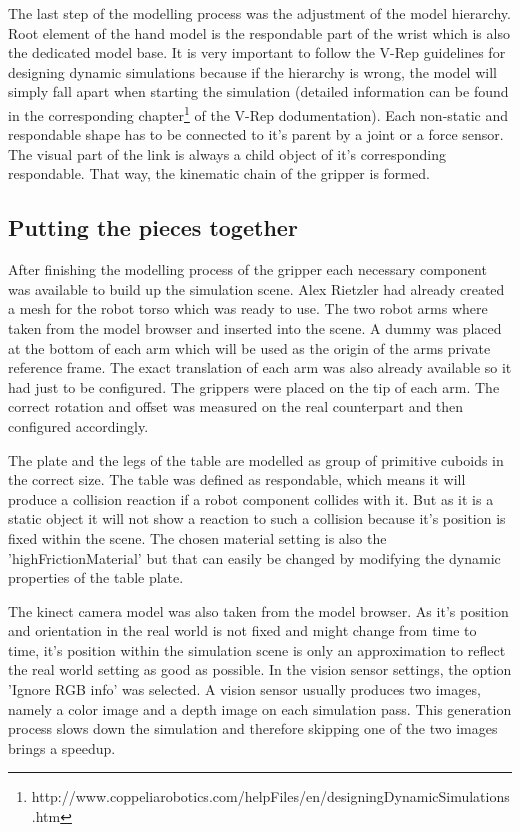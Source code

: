 The last step of the modelling process was the adjustment of the model hierarchy. Root element of the hand model is the respondable part of the wrist which is also the dedicated model base. It is very important to follow the V-Rep guidelines for designing dynamic simulations because if the hierarchy is wrong, the model will simply fall apart when starting the simulation (detailed information can be found in the corresponding chapter\footnote{http://www.coppeliarobotics.com/helpFiles/en/designingDynamicSimulations.htm} of the V-Rep dodumentation). Each non-static and respondable shape has to be connected to it's parent by a joint or a force sensor. The visual part of the link is always a child object of it's corresponding respondable. That way, the kinematic chain of the gripper is formed.


\subsection{Putting the pieces together}

After finishing the modelling process of the gripper each necessary component was available to build up the simulation scene. Alex Rietzler had already created a mesh for the robot torso which was ready to use. The two robot arms where taken from the model browser and inserted into the scene. A dummy was placed at the bottom of each arm which will be used as the origin of the arms private reference frame. The exact translation of each arm was also already available so it had just to be configured. The grippers were placed on the tip of each arm. The correct rotation and offset was measured on the real counterpart and then configured accordingly. 

The plate and the legs of the table are modelled as group of primitive cuboids in the correct size. The table was defined as respondable, which means it will produce a collision reaction if a robot component collides with it. But as it is a static object it will not show a reaction to such a collision because it's position is fixed within the scene. The chosen material setting is also the 'highFrictionMaterial' but that can easily be changed by modifying the dynamic properties of the table plate.

The kinect camera model was also taken from the model browser. As it's position and orientation in the real world is not fixed and might change from time to time, it's position within the simulation scene is only an approximation to reflect the real world setting as good as possible. In the vision sensor settings, the option 'Ignore RGB info' was selected. A vision sensor usually produces two images, namely a color image and a depth image on each simulation pass. This generation process slows down the simulation and therefore skipping one of the two images brings a speedup.

